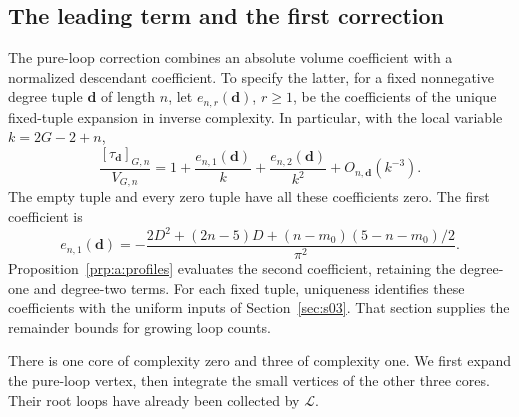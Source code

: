 \subsection{The leading term and the first correction}
\label{subsec:s04:02}

The pure-loop correction combines an absolute volume coefficient with
a normalized descendant coefficient. To specify the latter, for a
fixed nonnegative degree tuple $\mathbf d$ of length $n$, let
$e_{n,r}(\mathbf d)$, $r\geq1$, be the coefficients of the unique
fixed-tuple expansion in inverse complexity. In particular, with the
local variable $k=2G-2+n$,
\begin{equation}\label{eq:s04:profile-coefficients}
 \frac{[\tau_{\mathbf d}]_{G,n}}{V_{G,n}}
 =1+\frac{e_{n,1}(\mathbf d)}k
     +\frac{e_{n,2}(\mathbf d)}{k^2}+O_{n,\mathbf d}(k^{-3}).
\end{equation}
The empty tuple and every zero tuple have all these coefficients zero.
The first coefficient is
\begin{equation}\label{eq:s04:first-profile}
 e_{n,1}(\mathbf d)
 =-\frac{2D^2+(2n-5)D+(n-m_0)(5-n-m_0)/2}{\pi^2}.
\end{equation}
Proposition~\ref{prp:a:profiles} evaluates the second coefficient,
retaining the degree-one and degree-two terms. For each fixed tuple,
uniqueness identifies these coefficients with the uniform inputs of
Section~\ref{sec:s03}. That section supplies the remainder bounds
for growing loop counts.

There is one core of complexity zero and three of complexity one.
We first expand the pure-loop vertex, then integrate the small vertices
of the other three cores. Their root loops have already been collected
by $\mathcal L$.

